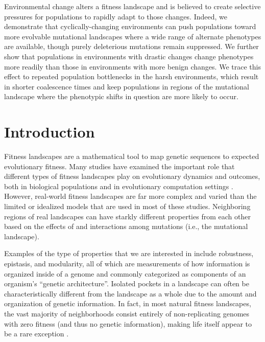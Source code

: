 \documentclass[10pt,letterpaper]{article}
\begin{document}
Environmental change alters a fitness landscape and is believed to create selective pressures for populations to rapidly adapt to those changes.  Indeed, we demonstrate that cyclically-changing environments can push populations toward more evolvable mutational landscapes where a wide range of alternate phenotypes are available, though purely deleterious mutations remain suppressed. We further show that populations in environments with drastic changes change phenotypes more readily than those in environments with more benign changes. We trace this effect to repeated population bottlenecks in the harsh environments, which result in shorter coalescence times and keep populations in regions of the mutational landscape where the phenotypic shifts in question are more likely to occur.

\linenumbers

\section*{Introduction}
Fitness landscapes are a mathematical tool to map genetic sequences to expected evolutionary fitness. Many studies have examined the important role that different types of fitness landscapes play on evolutionary dynamics and outcomes, both in biological populations \cite{khan_negative_2011,szendro_quantitative_2013,weinreich_darwinian_2006,nahum_tortoisehare_2015} and in evolutionary computation settings \cite{merz_fitness_2000,humeau_paradiseo-mo:_2013,kallel_theoretical_2013}. However, real-world fitness landscapes are far more complex and varied than the limited or idealized models that are used in most of these studies. Neighboring regions of real landscapes can have starkly different properties from each other based on the effects of and interactions among mutations (i.e., the mutational landscape).  

Examples of the type of properties that we are interested in include robustness, epistasis, and modularity, all of which are measurements of how information is organized inside of a genome and commonly categorized as components of an organism's ``genetic architecture''. Isolated pockets in a landscape can often be characteristically different from the landscape as a whole due to the amount and organization of genetic information.  In fact, in most natural fitness landscapes, the vast majority of neighborhoods consist entirely of non-replicating genomes with zero fitness (and thus no genetic information), making life itself appear to be a rare exception \cite{gavrilets_fitness_2004}.
\end{document}
